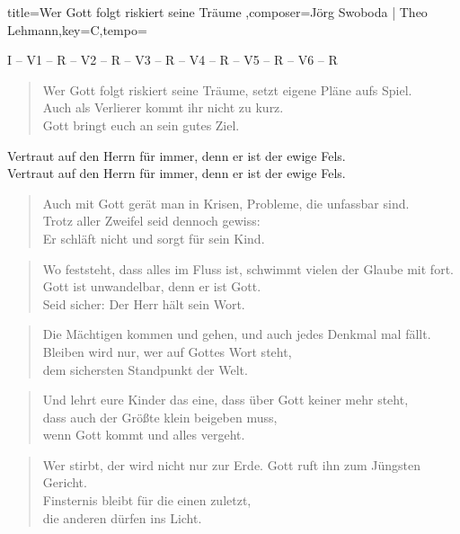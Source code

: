 \documentclass{leadsheet-modern}
\begin{document}
\begin{song}{title={Wer Gott folgt riskiert seine Träume
},composer={Jörg Swoboda | Theo Lehmann},key={C},tempo={}}

\begin{schedule}
I -- V1 -- R -- V2 -- R -- V3 -- R -- V4 -- R -- V5 -- R -- V6 -- R
\end{schedule}

\begin{intro}
\end{intro}

\begin{verse}
Wer Gott folgt riskiert seine Träume, 
setzt eigene Pläne aufs Spiel. \\
Auch als Verlierer kommt ihr nicht zu kurz. \\
Gott bringt euch an sein gutes Ziel.
\end{verse}

\begin{chorus}
Vertraut auf den Herrn für immer,
denn er ist der ewige Fels. \\
Vertraut auf den Herrn für immer,
denn er ist der ewige Fels.
\end{chorus}

\begin{verse}
Auch mit Gott gerät man in Krisen,
Probleme, die unfassbar sind. \\
Trotz aller Zweifel seid dennoch gewiss: \\
Er schläft nicht und sorgt für sein Kind.
\end{verse}

\begin{verse}
Wo feststeht, dass alles im Fluss ist,
schwimmt vielen der Glaube mit fort. \\
Gott ist unwandelbar, denn er ist Gott. \\
Seid sicher: Der Herr hält sein Wort.
\end{verse}

\begin{verse}
Die Mächtigen kommen und gehen,
und auch jedes Denkmal mal fällt. \\
Bleiben wird nur, wer auf Gottes Wort steht, \\
dem sichersten Standpunkt der Welt.
\end{verse}

\begin{verse}
Und lehrt eure Kinder das eine,
dass über Gott keiner mehr steht, \\
dass auch der Größte klein beigeben muss, \\
wenn Gott kommt und alles vergeht.
\end{verse}

\begin{verse}
Wer stirbt, der wird nicht nur zur Erde.
Gott ruft ihn zum Jüngsten Gericht. \\
Finsternis bleibt für die einen zuletzt, \\
die anderen dürfen ins Licht.
\end{verse}

\end{song}
\end{document}

